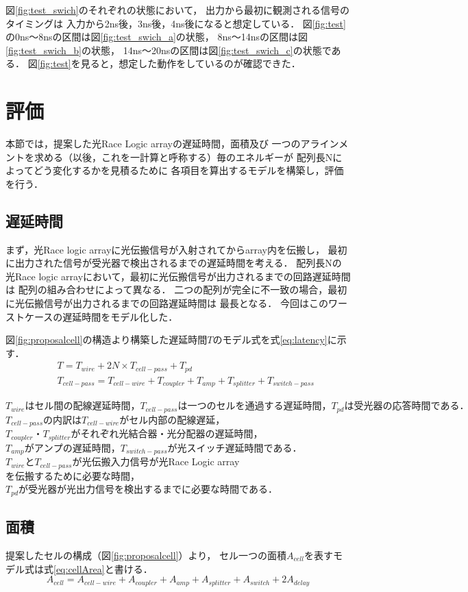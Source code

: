図\ref{fig:test_swich}のそれぞれの状態において，
出力から最初に観測される信号のタイミングは
入力から2ns後，3ns後，4ns後になると想定している．
図\ref{fig:test}の0ns〜8nsの区間は図\ref{fig:test_swich_a}の状態，
8ns〜14nsの区間は図\ref{fig:test_swich_b}の状態，
14ns〜20nsの区間は図\ref{fig:test_swich_c}の状態である．
図\ref{fig:test}を見ると，想定した動作をしているのが確認できた．

\section{評価}
本節では，提案した光Race Logic arrayの遅延時間，面積及び
一つのアラインメントを求める（以後，これを一計算と呼称する）毎のエネルギーが
配列長Nによってどう変化するかを見積るために
各項目を算出するモデルを構築し，評価を行う．
\subsection{遅延時間}
まず，光Race logic arrayに光伝搬信号が入射されてからarray内を伝搬し，
最初に出力された信号が受光器で検出されるまでの遅延時間を考える．
配列長Nの光Race logic arrayにおいて，最初に光伝搬信号が出力されるまでの回路遅延時間は
配列の組み合わせによって異なる．
二つの配列が完全に不一致の場合，最初に光伝搬信号が出力されるまでの回路遅延時間は
最長となる．
今回はこのワーストケースの遅延時間をモデル化した．

図\ref{fig:proposalcell}の構造より構築した遅延時間$T$のモデル式を式\ref{eq:latency}に示す．
\begin{eqnarray}
&&T = T_{wire}+2N \times T_{cell-pass}+T_{pd} \nonumber \\
&&T_{cell-pass} = T_{cell-wire}+T_{coupler}+T_{amp}+T_{splitter}+T_{switch-pass}
\label{eq:latency}
\end{eqnarray}

$T_{wire}はセル間の配線遅延時間，T_{cell-pass}は一つのセルを通過する遅延時間，T_{pd}は受光器の応答時間である．$
$T_{cell-pass}の内訳はT_{cell-wire}がセル内部の配線遅延，$
$T_{coupler}・T_{splitter}がそれぞれ光結合器・光分配器の遅延時間，$
$T_{amp}がアンプの遅延時間，T_{switch-pass}が光スイッチ遅延時間である．$
$T_{wire}とT_{cell-pass}が光伝搬入力信号が$光Race Logic array$を伝搬するために必要な時間，$
$T_{pd}が受光器が光出力信号を検出するまでに必要な時間である．$

\subsection{面積}
提案したセルの構成（図\ref{fig:proposalcell}）より，
セル一つの面積$A_{cell}$を表すモデル式は式\ref{eq:cellArea}と書ける．
\begin{equation}
A_{cell} = A_{cell-wire}+A_{coupler}+A_{amp}+A_{splitter}+A_{switch}+2A_{delay}
\label{eq:cellArea}
\end{equation}

